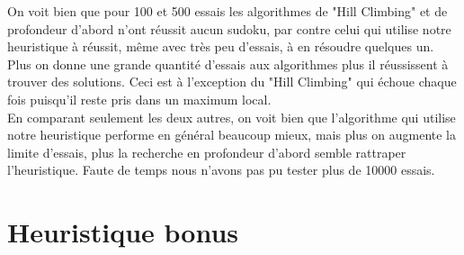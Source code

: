 \documentclass[a4paper,10pt]{article}
\begin{document}
On voit bien que pour 100 et 500 essais les algorithmes de "Hill Climbing" et de profondeur d'abord n'ont réussit aucun sudoku, par contre celui qui utilise notre heuristique à réussit, même avec très peu d'essais, à en résoudre quelques un. Plus on donne une grande quantité d'essais aux algorithmes plus il réussissent à trouver des solutions. Ceci est à l'exception du "Hill Climbing" qui échoue chaque fois puisqu'il reste pris dans un maximum local.\\

En comparant seulement les deux autres, on voit bien que l'algorithme qui utilise notre heuristique performe en général beaucoup mieux, mais plus on augmente la limite d'essais, plus la recherche en profondeur d'abord semble rattraper l'heuristique. Faute de temps nous n'avons pas pu tester plus de 10000 essais. 









\section{Heuristique bonus}
\end{document}

